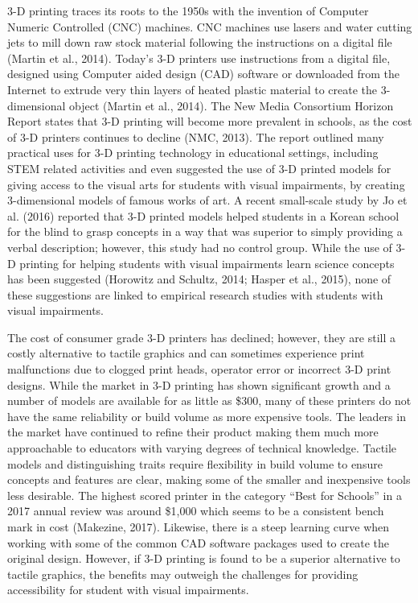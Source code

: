 \documentclass[11.5pt]{sig-alternate} %
\begin{document}
\begin{large}
3-D printing traces its roots to the 1950s with the invention of Computer Numeric Controlled (CNC) machines.  CNC machines use lasers and water cutting jets to mill down raw stock material following the instructions on a digital file (Martin et al., 2014).  Today’s 3-D printers use instructions from a digital file, designed using Computer aided design (CAD) software or downloaded from the Internet to extrude very thin layers of heated plastic material to create the 3-dimensional object (Martin et al., 2014).  The New Media Consortium Horizon Report states that 3-D printing will become more prevalent in schools, as the cost of 3-D printers continues to decline (NMC, 2013).  The report outlined many practical uses for 3-D printing technology in educational settings, including STEM related activities and even suggested the use of 3-D printed models for giving access to the visual arts for students with visual impairments, by creating 3-dimensional models of famous works of art.  A recent small-scale study by Jo et al. (2016) reported that 3-D printed models helped students in a Korean school for the blind to grasp concepts in a way that was superior to simply providing a verbal description; however, this study had no control group.  While the use of 3-D printing for helping students with visual impairments learn science concepts has been suggested (Horowitz and Schultz, 2014; Hasper et al., 2015), none of these suggestions are linked to empirical research studies with students with visual impairments.  

The cost of consumer grade 3-D printers has declined; however, they are still a costly alternative to tactile graphics and can sometimes experience print malfunctions due to clogged print heads, operator error or incorrect 3-D print designs.  While the market in 3-D printing has shown significant growth and a number of models are available for as little as \$300, many of these printers do not have the same reliability or build volume as more expensive tools. The leaders in the market have continued to refine their product making them much more approachable to educators with varying degrees of technical knowledge. Tactile models and distinguishing traits require flexibility in build volume to ensure concepts and features are clear, making some of the smaller and inexpensive tools less desirable. The highest scored printer in the category “Best for Schools” in a 2017 annual review was around \$1,000 which seems to be a consistent bench mark in cost (Makezine, 2017). Likewise, there is a steep learning curve when working with some of the common CAD software packages used to create the original design.  However, if 3-D printing is found to be a superior alternative to tactile graphics, the benefits may outweigh the challenges for providing accessibility for student with visual impairments. 


\end{large}
\end{document}
